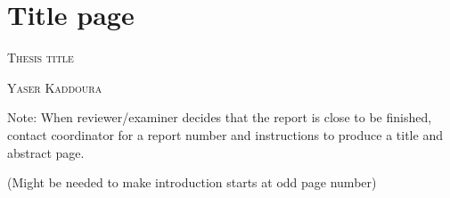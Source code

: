 \documentclass[a4paper, 12pt]{article}
\begin{document}

\thispagestyle{empty}
\section*{Title page}

\textsc{\large Thesis title }

\textsc{\large Yaser Kaddoura}

Note: When reviewer/examiner decides that the report is close to be finished,
contact coordinator for a report number and instructions to produce a title and
abstract page.

\newpage\null\thispagestyle{blank}\newpage

\thispagestyle{empty}


\newpage\null\thispagestyle{blank}\newpage

\tableofcontents

\newpage

\listoffigures

\newpage

\listoftables
\newpage




\newpage
\newpage\null(Might be needed to make introduction starts at odd page number)
\thispagestyle{blank}\newpage





\newpage

\printbibliography[heading=bibintoc, title={References}]

\newpage


\end{document}
